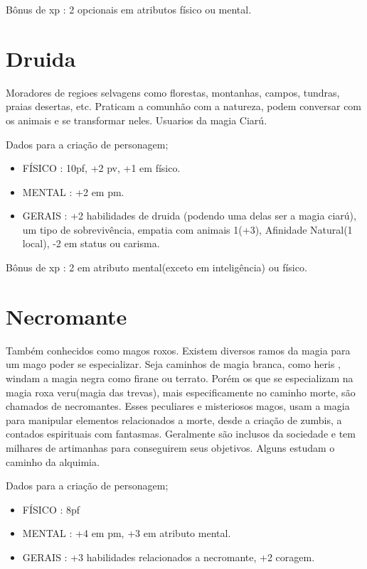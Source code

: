 Bônus de xp : 2 opcionais em atributos físico ou mental.

\section{Druida}

Moradores de regioes selvagens como florestas, montanhas, campos, tundras, praias desertas, etc. Praticam a comunhão com a natureza, podem conversar com os animais e se transformar neles. Usuarios da magia Ciarú.

Dados para a criação de personagem;

\begin{itemize}


	\item FÍSICO : 10pf, +2 pv, +1 em físico.

	\item MENTAL : +2 em pm.

	\item GERAIS : +2 habilidades de druida (podendo uma delas ser a magia ciarú), um tipo de sobrevivência, empatia com animais 1(+3), Afinidade Natural(1 local), -2 em status ou carisma.

\end{itemize}

Bônus de xp : 2 em atributo mental(exceto em inteligência) ou físico.

\section{Necromante}

Também conhecidos como magos roxos. Existem diversos ramos da magia para um mago poder se especializar. Seja caminhos de magia branca, como heris , windam a magia negra como firane ou terrato. Porém os que se especializam na magia roxa veru(magia das trevas), mais especificamente no caminho morte, são chamados de necromantes. Esses peculiares e misteriosos magos, usam a magia para manipular elementos relacionados a morte, desde a criação de zumbis, a contados espirituais com fantasmas. Geralmente são inclusos da sociedade e tem milhares de artimanhas para conseguirem seus objetivos. Alguns estudam o caminho da alquimia.

Dados para a criação de personagem;

\begin{itemize}


	\item FÍSICO : 8pf   

	\item MENTAL : +4 em pm, +3 em atributo mental.

	\item GERAIS : +3 habilidades relacionados a necromante, +2 coragem.


\end{itemize}

